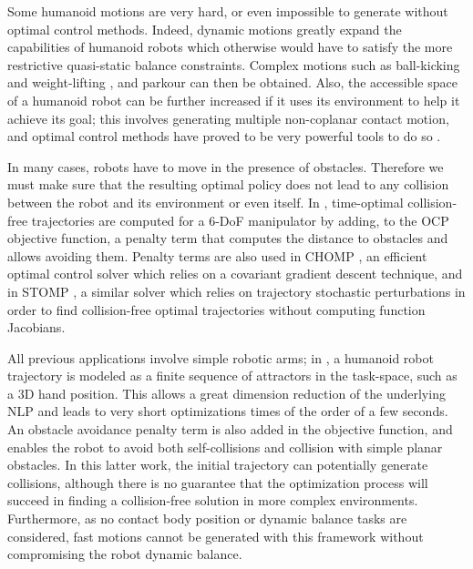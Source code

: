 Some humanoid motions are very hard, or even impossible to generate
without optimal control methods. Indeed, dynamic motions greatly
expand the capabilities of humanoid robots which otherwise would have
to satisfy the more restrictive quasi-static balance
constraints. Complex motions such as ball-kicking
\cite{miossec2006development} and weight-lifting
\cite{arisumi2008dynamic}, and parkour \cite{dellin2012framework} can
then be obtained. Also, the accessible space of a humanoid robot can
be further increased if it uses its environment to help it achieve its
goal; this involves generating multiple non-coplanar contact motion,
and optimal control methods have proved to be very powerful tools to
do so \cite{lengagne2013generation}.

\bigskip

In many cases, robots have to move in the presence of
obstacles. Therefore we must make sure that the resulting optimal
policy does not lead to any collision between the robot and its
environment or even itself. In \cite{dubowsky1986time}, time-optimal
collision-free trajectories are computed for a 6-DoF manipulator by
adding, to the OCP objective function, a penalty term that computes
the distance to obstacles and allows avoiding them. Penalty terms
are also used in \textsc{CHOMP} \cite{ratliff2009chomp}, an efficient
optimal control solver which relies on a covariant gradient descent
technique, and in \textsc{STOMP} \cite{Kalakrishnan2011}, a similar
solver which relies on trajectory stochastic perturbations in order to
find collision-free optimal trajectories without computing function
Jacobians.

All previous applications involve simple robotic arms; in
\cite{Toussaint2007}, a humanoid robot trajectory is modeled as a
finite sequence of attractors in the task-space, such as a 3D hand
position. This allows a great dimension reduction of the underlying
NLP and leads to very short optimizations times of the order of a few
seconds. An obstacle avoidance penalty term is also added in the
objective function, and enables the robot to avoid both
self-collisions and collision with simple planar obstacles. In this
latter work, the initial trajectory can potentially generate
collisions, although there is no guarantee that the optimization
process will succeed in finding a collision-free solution in more
complex environments. Furthermore, as no contact body position or
dynamic balance tasks are considered, fast motions cannot be generated
with this framework without compromising the robot dynamic balance.

